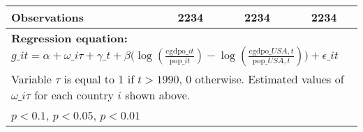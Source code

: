 \begin{table}[htbp]
\begin{tabular}{l*{3}{c}}
Observations    &     2234         &     2234         &     2234         \\
\bottomrule
\multicolumn{4}{l}{\footnotesize \textbf{Regression equation:} \(g\_{it} = \alpha + \omega\_{i\tau} + \gamma\_t + \beta \big(\log (\frac{\textrm{cgdpo}\_{it}}{\textrm{pop}\_{it}} ) - \log (\frac{\textrm{cgdpo}\_{USA,t}}{\textrm{pop}\_{USA,t}}  ) \big) + \epsilon\_{it}\)}\\
\multicolumn{4}{l}{\footnotesize Variable \(\tau\) is equal to 1 if \(t > 1990\), 0 otherwise. Estimated values of \(\omega\_{i\tau}\) for each country \(i\) shown above.}\\
\multicolumn{4}{l}{\footnotesize \sym{*} \(p<0.1\), \sym{**} \(p<0.05\), \sym{***} \(p<0.01\)}\\
\end{tabular}
\end{table}
